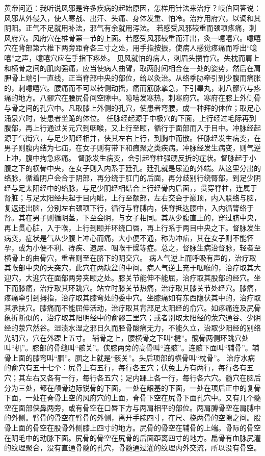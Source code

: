 \documentclass[12pt,UTF8]{ctexbook}
\begin{document}
黄帝问道：我听说风邪是许多疾病的起始原因，怎样用针法来治疗？岐伯回答说：风邪从外侵入，使人寒战、出汗、头痛、身体发重、怕冷。治疗用府穴，以调和其阴阳。正气不足就用补法，邪气有余就用泻法。
若感受风邪较重而颈项疼痛，刺风府穴。风府穴在椎骨第一节的上面。若感受风邪较重而汗出，灸一噫嘻穴。噫嘻穴在背部第六椎下两旁距脊各三寸之处，用手指按振，使病人感觉疼痛而呼出“噫嘻”之声，噫嘻穴应在手指下疼处。
见风就怕的病人，刺眉头攒竹穴。失枕而肩上和横骨之间的肌肉强痛，应当使病人曲臂，取两肘间相合在一处的姿势，然后在肩胛骨上端引一直线，正当脊部中央的部位，给以灸治。从络季胁牵引到少腹而痛胀的，刺噫嘻穴。腰痛而不可以转侧动摇，痛而筋脉挛急，下引睾丸，刺八髎穴与疼痛的地方。八髎穴在腰尻骨间空隙中。噫嘻发寒热，刺寒府穴。寒府在膝上外侧骨与骨之间的孔穴中。凡取膝上外侧的孔穴，使患者弯腰，成一种拜的体位；取足心涌泉穴时，使患者坐跪的体位。
任脉经起源于中极穴的下面，上行经过毛际再到腹部，再上行通过关元穴到咽喉，又上行至颐，循行于面部而入于目中。冲脉经起源于气街穴，与足少阴经相并，侠其左右上行，到胸中而散。任脉经发生病变，在男子则腹内结为七疝，在女子则有带下和瘕聚之类疾病。冲脉经发生病变，则气逆上冲，腹中拘急疼痛。
督脉发生病变，会引起脊柱强硬反折的症状。督脉起于小腹之下的横骨中央，在女子则入内系于廷孔。廷孔就是尿道的外端。从这里分出的络脉，循着阴户会合于阴部，再分绕于肛门的后面，再分歧别行绕臀部，到足少阴经与足太阳经中的络脉，与足少阴经相结合上行经骨内后面，，贯穿脊柱，连属于肾脏；与足太阳经共起于目内眦，上行至额部，左右交会于巅顶，内入联络与脑，复返还出脑，分别左右颈项下行，循行与脊膊内，侠脊抵达腰中，入内循膂络于肾。其在男子则循阴茎，下至会阴，与女子相同。其从少腹直上的，穿过脐中央，再上贯心脏，入于喉，上行到颐并环绕口唇，再上行系于两目中央之下。督脉发生病变，症状是气从少腹上冲心而痛，大小便不通，称为冲疝，其在女子则不能怀孕，或为小便不利、痔疾、遗尿、咽喉干燥等症。总之，督脉生病治督脉，轻者至横骨上的曲骨穴，重者则至在脐下的阴交穴。
病人气逆上而呼吸有声的，治疗取其喉部中央的天突穴，此穴在两缺盆的中间。病人气逆上充于咽喉的，治疗取其大迎穴，大迎穴在面部两旁夹颐之处。膝关节能伸不能屈，治疗取其股部的经穴。坐下而膝痛，治疗取其环跳穴。站立时膝关节热痛，治疗取其膝关节处经穴。膝痛，疼痛牵引到拇指，治疗取其膝弯处的委中穴。坐膝痛如有东西隐伏其中的，治疗取其承扶穴。膝痛而不能屈伸活动，治疗取其背部足太阳经的俞穴。如疼痛连及尻骨象折断似的，治疗取其阳明经中的俞髎三里穴；或者别取太阳经的荥穴通谷、少阴经的荥穴然谷。湿渍水湿之邪日久而胫骨酸痛无力，不能久立，治取少阳经的别络光明穴，穴在外踝上五寸。
辅骨之上，腰横骨之下叫“楗”。髋骨两侧环跳穴处叫“机”。膝部的骨缝叫“骸关”。侠膝两旁的高骨叫“连骸”。连骸下面叫“辅骨”。辅骨上面的膝弯叫“腘”。腘之上就是“骸关”。头后项部的横骨叫“枕骨”。
治疗水病的俞穴有五十七个：尻骨上有五行，每行各五穴；伏兔上方有两行，每行各有五穴；其左右又各有一行，每行各五穴；足内踝上各一行，每行各六穴。髓穴在脑后分为三处，都在颅骨边际锐骨的下面，一处在龈基的下面，一处在项后正中的复骨下面，一处在脊骨上空的风府穴的上面，脊骨下空在尻骨下面孔穴中。又有几个髓空在面部侠鼻两旁，或有骨空在口唇下方与两肩相平的部位。两肩膊骨空在肩膊中的外侧。臂骨的骨空在臂骨的外侧，离开手腕四寸，在尺、桡两骨的空隙之间。股骨上面的骨空在股骨外侧膝上四寸的地方。尻骨的骨空在辅骨的上端。骨际的骨空在阴毛中的动脉下面。尻骨的骨空在尻骨的后面距离四寸的地方。扁骨有血脉尻灌的纹理聚合，没有直通骨髓的孔穴，骨髓通过灌的纹理内外交流，所以没有骨空。
\end{document}
